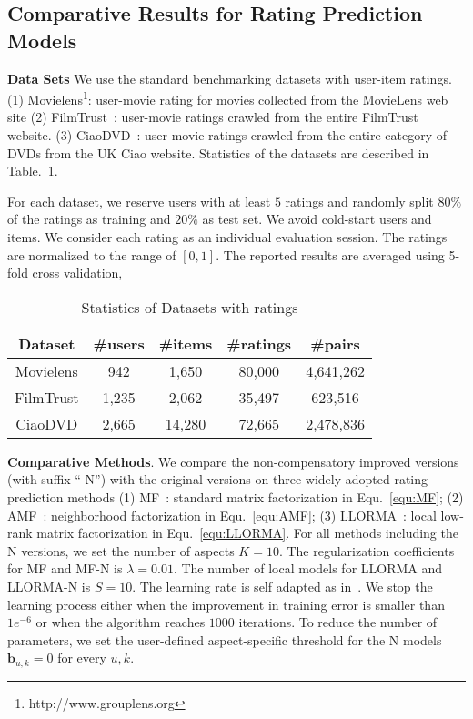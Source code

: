 \documentclass[letterpaper]{article} %
\begin{document}
\subsection{Comparative Results for Rating Prediction Models}

\textbf{Data Sets} We use the standard benchmarking datasets with user-item ratings. (1) Movielens\footnote{http://www.grouplens.org}: user-movie rating for movies collected from the MovieLens web site (2) FilmTrust~\cite{Guo2013Novel}: user-movie ratings crawled from the entire FilmTrust website. (3) CiaoDVD~\cite{Guo2014ETAF}: user-movie ratings crawled from the entire category of DVDs from the UK Ciao website. Statistics of the datasets are described in Table.~\ref{tab:datasets}. 

For each dataset, we reserve users with at least $5$ ratings and randomly split $80\%$ of the ratings as training and $20\%$ as test set. We avoid cold-start users and items. We consider each rating as an individual evaluation session. The ratings are normalized to the range of $[0,1]$. The reported results are averaged using 5-fold cross validation, 

\begin{table}[htp]
\tiny
\caption{Statistics of Datasets with ratings}
\begin{center}
\begin{tabular}{|c|c|c|c|c|}
\hline
Dataset & \#users & \#items & \#ratings & \#pairs \\\hline
Movielens &942 &1,650 &80,000 &4,641,262 \\\hline
FilmTrust &1,235 &2,062 &35,497 &623,516 \\\hline
CiaoDVD &2,665 &14,280 &72,665 &2,478,836 \\\hline
\end{tabular}
\end{center}
\label{tab:datasets}
\end{table}%
 

\textbf{Comparative Methods}. We compare the non-compensatory improved versions (with suffix ``-N'') with the original versions on three widely adopted rating prediction methods (1) MF~\cite{Koren2009Matrix}: standard matrix factorization in Equ.~\ref{equ:MF};  (2) AMF~\cite{Koren2008Factorization}: neighborhood factorization in Equ.~\ref{equ:AMF}; (3) LLORMA~\cite{Lee2013Local}: local low-rank matrix factorization in Equ.~\ref{equ:LLORMA}. For all methods including the N versions, we set the number of aspects $K=10$. The regularization coefficients for MF and MF-N is $\lambda=0.01$. The number of local models for LLORMA and LLORMA-N is $S=10$. The learning rate is self adapted as in~\cite{Wilson2003general}.  We stop the learning process either when the improvement in training error is smaller than $1e^{-6}$ or when the algorithm reaches $1000$ iterations. To reduce the number of parameters, we set the user-defined aspect-specific threshold for the N models $\mathbf{b}_{u,k}=0$ for every $u,k$. 
\end{document}
